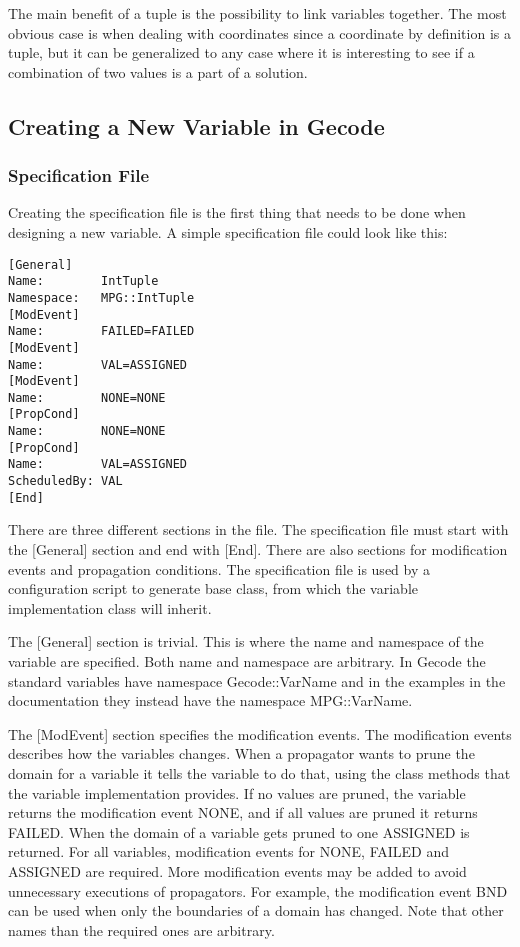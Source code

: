 \documentclass[a4paper,11pt]{article}
\begin{document}
The main benefit of a tuple is the possibility to link variables together. The most obvious case is when dealing with coordinates since a coordinate by definition is a tuple, but it can be generalized to any case where it is interesting to see if a combination of two values is a part of a solution. 

\newpage

\subsection{Creating a New Variable in Gecode}
\subsubsection{Specification File}
Creating the specification file is the first thing that needs to be done when designing a new variable.  A simple specification file could look like this:

\begin{lstlisting}[frame=single]
[General]
Name:        IntTuple
Namespace:   MPG::IntTuple
[ModEvent]
Name:        FAILED=FAILED
[ModEvent]
Name:        VAL=ASSIGNED
[ModEvent]
Name:        NONE=NONE
[PropCond]
Name:        NONE=NONE
[PropCond]
Name:        VAL=ASSIGNED
ScheduledBy: VAL
[End]
\end{lstlisting}
There are three different sections in the file. The specification file must start with the [General] section and end with [End]. There are also sections for modification events and propagation conditions. The specification file is used by a configuration script to generate base class, from which the variable implementation class will inherit.

The [General] section is trivial. This is where the name and namespace of the variable are specified. Both name and namespace are arbitrary. In Gecode the standard variables have namespace Gecode::VarName and in the examples in the documentation they instead have the namespace MPG::VarName.

The [ModEvent] section specifies the modification events. The modification events describes how the variables changes. When a propagator wants to prune the domain for a variable it tells the variable to do that, using the class methods that the variable implementation provides. If no values are pruned, the variable returns the modification event NONE, and if all values are pruned it returns FAILED. When the domain of a variable gets pruned to one ASSIGNED is returned. For all variables, modification events for NONE, FAILED and ASSIGNED are required. More modification events may be added to avoid unnecessary executions of propagators. For example, the modification event BND can be used when only the boundaries of a domain has changed. Note that other names than the required ones are arbitrary.
\end{document}
